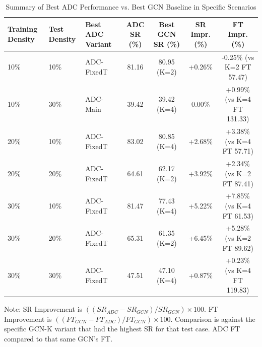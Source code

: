 \begin{table}[htbp]
    \centering
    \caption{Summary of Best ADC Performance vs. Best GCN Baseline in Specific Scenarios}
    \label{tab:adc_vs_gcn_best_cases}
    \scriptsize
    \begin{tabular}{l l l c c c c}
        \toprule
        Training Density & Test Density & Best ADC Variant & ADC SR (\%) & Best GCN SR (\%) & SR Impr. (\%) & FT Impr. (\%) \\
        \midrule
        10\% & 10\% & ADC-FixedT & 81.16 & 80.95 (K=2) & +0.26\% & -0.25\% (vs K=2 FT 57.47) \\ %
        10\% & 30\% & ADC-Main & 39.42 & 39.42 (K=4) & 0.00\% & +0.99\% (vs K=4 FT 131.33) \\ %
        \midrule
        20\% & 10\% & ADC-FixedT & 83.02 & 80.85 (K=4) & +2.68\% & +3.38\% (vs K=4 FT 57.71) \\ %
        20\% & 20\% & ADC-FixedT & 64.61 & 62.17 (K=2) & +3.92\% & +2.34\% (vs K=2 FT 87.41) \\ %
        \midrule
        30\% & 10\% & ADC-FixedT & 81.47 & 77.43 (K=4) & +5.22\% & +7.85\% (vs K=4 FT 61.53) \\ %
        30\% & 20\% & ADC-FixedT & 65.31 & 61.35 (K=2) & +6.45\% & +5.28\% (vs K=2 FT 89.62) \\ %
        30\% & 30\% & ADC-FixedT & 47.51 & 47.10 (K=4) & +0.87\% & +0.23\% (vs K=4 FT 119.83) \\ %
        \bottomrule
    \end{tabular}
    \justify \scriptsize Note: SR Improvement is $((SR_{ADC} - SR_{GCN}) / SR_{GCN}) \times 100$. FT Improvement is $((FT_{GCN} - FT_{ADC}) / FT_{GCN}) \times 100$. Comparison is against the specific GCN-K variant that had the highest SR for that test case. ADC FT compared to that same GCN's FT.
\end{table}

